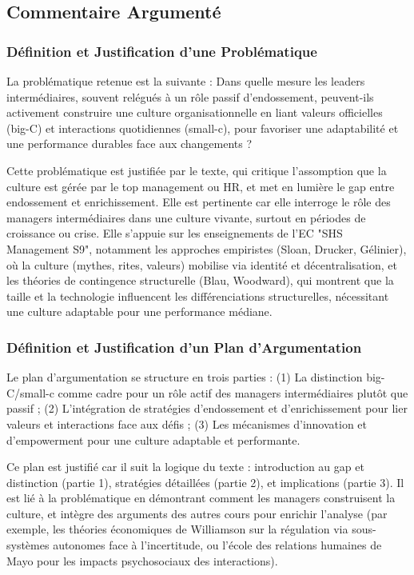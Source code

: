 \documentclass{rapportECL}
\begin{document}
\subsection{Commentaire Argumenté}

\subsubsection{Définition et Justification d’une Problématique}
La problématique retenue est la suivante : Dans quelle mesure les leaders intermédiaires, souvent relégués à un rôle passif d'endossement, peuvent-ils activement construire une culture organisationnelle en liant valeurs officielles (big-C) et interactions quotidiennes (small-c), pour favoriser une adaptabilité et une performance durables face aux changements ?

Cette problématique est justifiée par le texte, qui critique l'assomption que la culture est gérée par le top management ou HR, et met en lumière le gap entre endossement et enrichissement. Elle est pertinente car elle interroge le rôle des managers intermédiaires dans une culture vivante, surtout en périodes de croissance ou crise. Elle s’appuie sur les enseignements de l’EC "SHS Management S9", notamment les approches empiristes (Sloan, Drucker, Gélinier), où la culture (mythes, rites, valeurs) mobilise via identité et décentralisation, et les théories de contingence structurelle (Blau, Woodward), qui montrent que la taille et la technologie influencent les différenciations structurelles, nécessitant une culture adaptable pour une performance médiane.

\subsubsection{Définition et Justification d’un Plan d’Argumentation}
Le plan d’argumentation se structure en trois parties : (1) La distinction big-C/small-c comme cadre pour un rôle actif des managers intermédiaires plutôt que passif ; (2) L'intégration de stratégies d'endossement et d'enrichissement pour lier valeurs et interactions face aux défis ; (3) Les mécanismes d'innovation et d'empowerment pour une culture adaptable et performante.

Ce plan est justifié car il suit la logique du texte : introduction au gap et distinction (partie 1), stratégies détaillées (partie 2), et implications (partie 3). Il est lié à la problématique en démontrant comment les managers construisent la culture, et intègre des arguments des autres cours pour enrichir l'analyse (par exemple, les théories économiques de Williamson sur la régulation via sous-systèmes autonomes face à l'incertitude, ou l'école des relations humaines de Mayo pour les impacts psychosociaux des interactions).
\end{document}
